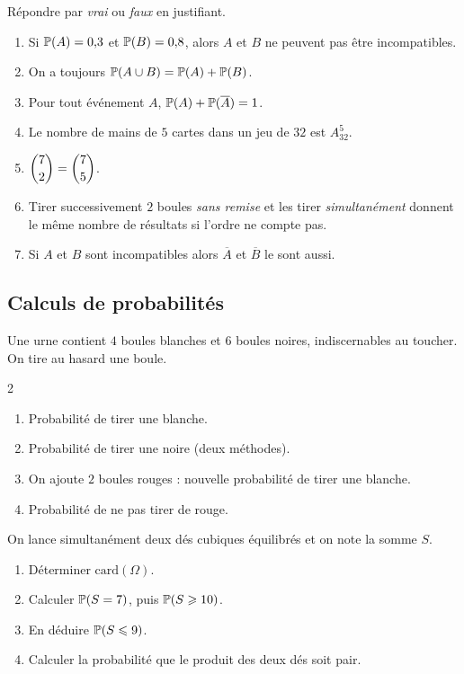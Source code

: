 Répondre par \emph{vrai} ou \emph{faux} en justifiant.
\begin{enumerate}
	\item Si $\mathbb{P}(A)=0{,}3$ et $\mathbb{P}(B)=0{,}8$, alors $A$ et $B$ ne peuvent
	pas être incompatibles.
	\item On a toujours $\mathbb{P}(A\cup B)=\mathbb{P}(A)+\mathbb{P}(B)$.
	\item Pour tout événement $A$, $\mathbb{P}(A)+\mathbb{P}(\overline{A})=1$.
	\item Le nombre de mains de $5$ cartes dans un jeu de $32$ est $A_{32}^{5}$.
	\item $\dbinom{7}{2}=\dbinom{7}{5}$.
	\item Tirer successivement $2$ boules \emph{sans remise} et les tirer
	\emph{simultanément} donnent le même nombre de résultats si l'ordre ne
	compte pas.
	\item Si $A$ et $B$ sont incompatibles alors $\overline{A}$ et
	$\overline{B}$ le sont aussi.
\end{enumerate}

\subsection{Calculs de probabilités}

Une urne contient $4$ boules blanches et $6$ boules noires, indiscernables au
toucher. On tire au hasard une boule.
\begin{multicols}{2}
\begin{enumerate}
	\item Probabilité de tirer une blanche.
	\item Probabilité de tirer une noire (deux méthodes).
	\item On ajoute $2$ boules rouges : nouvelle probabilité de tirer une
	blanche.
	\item Probabilité de ne pas tirer de rouge.
\end{enumerate}
\end{multicols}

On lance simultanément deux dés cubiques équilibrés et on note la somme $S$.
\begin{enumerate}
	\item Déterminer $\mathrm{card}(\Omega)$.
	\item Calculer $\mathbb{P}(S=7)$, puis $\mathbb{P}(S\geqslant 10)$.
	\item En déduire $\mathbb{P}(S\leqslant 9)$.
	\item Calculer la probabilité que le produit des deux dés soit pair.
\end{enumerate}

